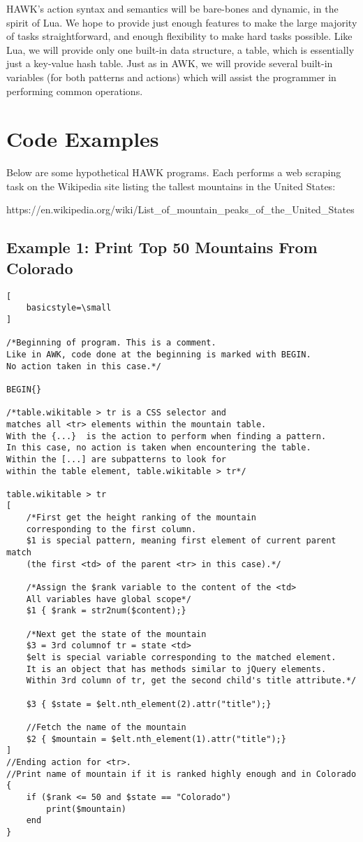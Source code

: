 \documentclass[12pt]{article}
\begin{document}
HAWK's action syntax and semantics will be bare-bones and dynamic, in the spirit of Lua. We hope to provide just enough features to make the large majority of tasks straightforward, and enough flexibility to make hard tasks possible. Like Lua, we will provide only one built-in data structure, a table, which is essentially just a key-value hash table. Just as in AWK, we will provide several built-in variables (for both patterns and actions) which will assist the programmer in performing common operations.

\section*{Code Examples}

Below are some hypothetical HAWK programs. Each performs a web scraping task on the Wikipedia site listing the tallest mountains in the United States:

https://en.wikipedia.org/wiki/List\_of\_mountain\_peaks\_of\_the\_United\_States

\subsection*{Example 1: Print Top 50 Mountains From Colorado}

\begin{lstlisting}[
    basicstyle=\small
]

/*Beginning of program. This is a comment.
Like in AWK, code done at the beginning is marked with BEGIN.
No action taken in this case.*/

BEGIN{}

/*table.wikitable > tr is a CSS selector and
matches all <tr> elements within the mountain table.
With the {...}  is the action to perform when finding a pattern.
In this case, no action is taken when encountering the table.
Within the [...] are subpatterns to look for 
within the table element, table.wikitable > tr*/

table.wikitable > tr
[
	/*First get the height ranking of the mountain
	corresponding to the first column.
	$1 is special pattern, meaning first element of current parent match
	(the first <td> of the parent <tr> in this case).*/

	/*Assign the $rank variable to the content of the <td>
	All variables have global scope*/
	$1 { $rank = str2num($content);}

	/*Next get the state of the mountain
	$3 = 3rd columnof tr = state <td>
	$elt is special variable corresponding to the matched element.
	It is an object that has methods similar to jQuery elements.
	Within 3rd column of tr, get the second child's title attribute.*/
	
	$3 { $state = $elt.nth_element(2).attr("title");}

	//Fetch the name of the mountain
	$2 { $mountain = $elt.nth_element(1).attr("title");}
]
//Ending action for <tr>.
//Print name of mountain if it is ranked highly enough and in Colorado
{
	if ($rank <= 50 and $state == "Colorado")
		print($mountain)
	end
}
\end{lstlisting}
\end{document}
